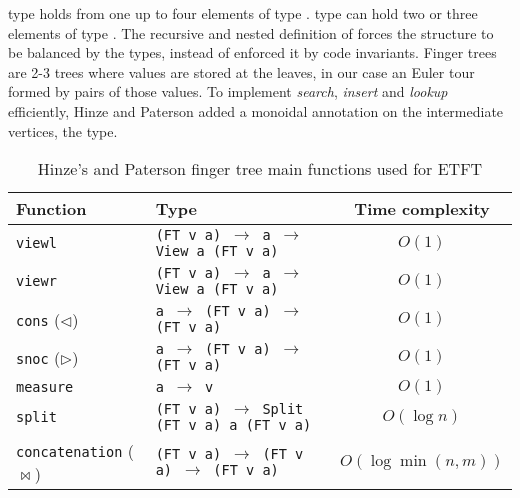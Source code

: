  type holds from one up to four elements of type .  type can hold two or three elements of type . The recursive and nested definition of  forces the structure to be balanced by the types, instead of enforced it by code invariants. Finger trees are 2-3 trees where values are stored at the leaves, in our case an Euler tour formed by pairs of those values. To implement \textit{search}, \textit{insert} and \textit{lookup} efficiently, Hinze and Paterson \cite{FTs} added a monoidal annotation on the intermediate vertices, the  type.

\small
\begin{table}
\begin{center}
\begin{tabular}{||l | l | c||} 
 \hline
 Function                           & Type                                              & Time complexity \\ 
 \hline\hline
 \texttt{viewl}                     & \texttt{(FT v a) $\to$ a $\to$ View a (FT v a)}   & $O(1)$ \\ 
 \texttt{viewr}                     & \texttt{(FT v a) $\to$ a $\to$ View a (FT v a)}   & $O(1)$ \\
 \hline
 \texttt{cons} ($\lhd$)             & \texttt{a $\to$ (FT v a) $\to$ (FT v a)}          & $O(1)$ \\ 
 \texttt{snoc} ($\rhd$)             & \texttt{a $\to$ (FT v a) $\to$ (FT v a)}          & $O(1)$ \\
 \hline
 \texttt{measure}                   & \texttt{a $\to$ v}                                & $O(1)$ \\
 \hline
 \texttt{split}                     & \texttt{(FT v a) $\to$ Split (FT v a) a (FT v a)} & $O(\log n)$ \\
 \texttt{concatenation} ($\bowtie$) & \texttt{(FT v a) $\to$ (FT v a) $\to$ (FT v a)}   & $O(\log \min (n,m))$ \\
 \hline   
\end{tabular}
\caption{Hinze's and Paterson finger tree main functions used for ETFT}
\label{tab:FTfuncs} 
\end{center}
\end{table}
\normalsize


